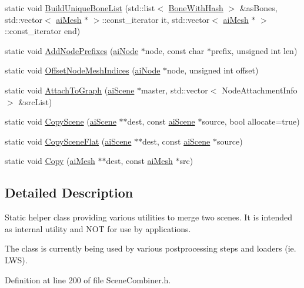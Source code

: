 \begin{CompactItemize}
\item 
static void \hyperlink{class_assimp_1_1_scene_combiner_9bfbbbab2ece2925fc3628c587ea9dcc}{BuildUniqueBoneList} (std::list$<$ \hyperlink{struct_assimp_1_1_bone_with_hash}{BoneWithHash} $>$ \&asBones, std::vector$<$ \hyperlink{structai_mesh}{aiMesh} $\ast$ $>$::const\_\-iterator it, std::vector$<$ \hyperlink{structai_mesh}{aiMesh} $\ast$ $>$::const\_\-iterator end)
\item 
static void \hyperlink{class_assimp_1_1_scene_combiner_5e4ec755bb270b894e37d20938a4a88b}{AddNodePrefixes} (\hyperlink{structai_node}{aiNode} $\ast$node, const char $\ast$prefix, unsigned int len)
\item 
static void \hyperlink{class_assimp_1_1_scene_combiner_0c52e873dfdd0c71f7f2bae06bcbb865}{OffsetNodeMeshIndices} (\hyperlink{structai_node}{aiNode} $\ast$node, unsigned int offset)
\item 
static void \hyperlink{class_assimp_1_1_scene_combiner_1672dc80009a8183edbabc4ef262b5c5}{AttachToGraph} (\hyperlink{structai_scene}{aiScene} $\ast$master, std::vector$<$ NodeAttachmentInfo $>$ \&srcList)
\item 
static void \hyperlink{class_assimp_1_1_scene_combiner_855a472e4848d737ef1ff091363f3a7c}{CopyScene} (\hyperlink{structai_scene}{aiScene} $\ast$$\ast$dest, const \hyperlink{structai_scene}{aiScene} $\ast$source, bool allocate=true)
\item 
static void \hyperlink{class_assimp_1_1_scene_combiner_fd836d513bc02da4c40d1432bf687f3e}{CopySceneFlat} (\hyperlink{structai_scene}{aiScene} $\ast$$\ast$dest, const \hyperlink{structai_scene}{aiScene} $\ast$source)
\item 
static void \hyperlink{class_assimp_1_1_scene_combiner_abed196fdfb16f82873ec811c6a64bfc}{Copy} (\hyperlink{structai_mesh}{aiMesh} $\ast$$\ast$dest, const \hyperlink{structai_mesh}{aiMesh} $\ast$src)
\end{CompactItemize}


\subsection{Detailed Description}
Static helper class providing various utilities to merge two scenes. It is intended as internal utility and NOT for use by applications. 

The class is currently being used by various postprocessing steps and loaders (ie. LWS). 

Definition at line 200 of file SceneCombiner.h.


